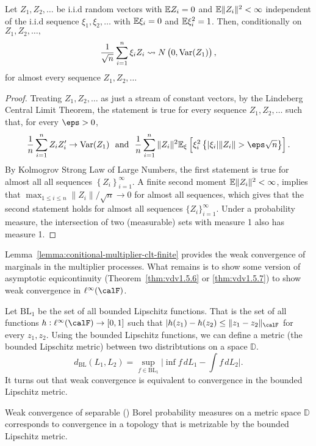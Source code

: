 \begin{lemma}
	\label{lemma:conitional-multiplier-clt-finite}
	Let \(Z_1,Z_2,\dots\) be i.i.d random vectors with \(\mathbb{E} Z_i =0\) and \(\mathbb{E}\|Z_i\|^2 <\infty\) independent of the i.i.d sequence \(\xi_1,\xi_2,\dots\) with \(\mathbb{E}\xi_i=0\) and \(\mathbb{E}\xi_i^2=1\). Then, conditionally on \(Z_1,Z_2,\dots,\)
	\[
		\frac{1}{\sqrt{n}}\sum_{i=1}^n \xi_iZ_i\rightsquigarrow N\left(0, \operatorname{Var}(Z_1)\right)
	,\]
	for almost every sequence \(Z_1,Z_2,\dots\)
\end{lemma}
\begin{proof}
	Treating \(Z_1,Z_2,\dots\) as just a stream of constant vectors, by the Lindeberg Central Limit Theorem, the statement is true for every sequence \(Z_1,Z_2,\dots\) such that, for every \(\eps > 0\),
	\[
		\frac{1}{n} \sum_{i=1}^n Z_iZ_i'\to \Var(Z_1)\andbox \frac{1}{n}\sum_{i=1}^n \|Z_i\|^2\E_\xi\left[\xi_i^2\left\{|\xi_i|\|Z_i\| > \eps\sqrt{n}\right\}\right]
	.\]
	By Kolmogrov Strong Law of Large Numbers, the first statement is true for almost all all sequences \(\left\{Z_i\right\}_{i=1}^\infty\). A finite second moment \(\mathbb{E}\|Z_i\|^2 <\infty\), implies that \(\max_{1\leq i\leq n}\|Z_i\|/\sqrt{n}\to0\) for almost all sequences, which gives that the second statement holds for almost all sequences \(\{Z_i\}_{i=1}^\infty\). Under a probability measure, the intersection of two (measurable) sets with measure 1 also has measure 1.
\end{proof}

Lemma~\ref{lemma:conitional-multiplier-clt-finite} provides the weak convergence of marginals in the multiplier processes. What remains is to show some version of asymptotic equicontinuity (Theorem~\ref{thm:vdv1.5.6} or \ref{thm:vdv1.5.7}) to show weak convergence in \(\ell^\infty(\calF)\). 

Let \(\text{BL}_1\) be the set of all bounded Lipschitz functions. That is the set of all functions \(h:\ell^\infty(\calF)\to[0,1]\) such that \(|h(z_1)-h(z_2)\leq \|z_1-z_2\|_\calF\) for every \(z_1,z_2\). Using the bounded Lipschitz functions, we can define a metric (the bounded Lipschitz metric) between two distribtutions on a space \(\mathbb{D}\). 
\[
	d_{\text{BL}}(L_1,L_2) = \sup_{f\in \text{BL}_1} \bigg|\inf f\,dL_1 - \int f\,dL_2\bigg|
.\] 
It turns out that weak convergence is equivalent to convergence in the bounded Lipschitz metric. 
\begin{theorem}
	\label{thm:weak-convergence-bounded-lipschitz}
	Weak convergence of separable () Borel probability measures on a metric space \(\mathbb{D}\) corresponds to convergence in a topology that is metrizable by the bounded Lipschitz metric.
\end{theorem}

